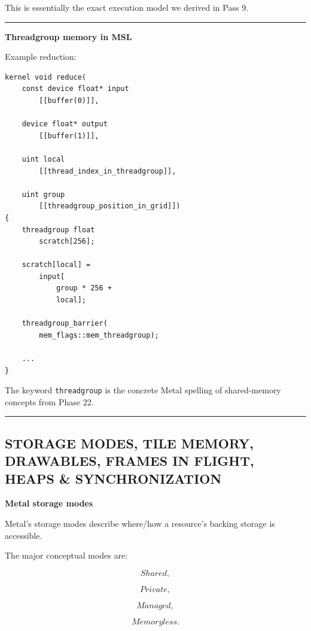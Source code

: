 This is essentially the exact execution model we derived in Pass 9.

\begin{center}\rule{0.5\linewidth}{0.5pt}\end{center}

\textbf{Threadgroup memory in MSL}

Example reduction:

\begin{verbatim}
kernel void reduce(
    const device float* input
        [[buffer(0)]],

    device float* output
        [[buffer(1)]],

    uint local
        [[thread_index_in_threadgroup]],

    uint group
        [[threadgroup_position_in_grid]])
{
    threadgroup float
        scratch[256];

    scratch[local] =
        input[
            group * 256 +
            local];

    threadgroup_barrier(
        mem_flags::mem_threadgroup);

    ...
}
\end{verbatim}

The keyword \texttt{threadgroup} is the concrete Metal spelling of shared-memory concepts from Phase 22.

\begin{center}\rule{0.5\linewidth}{0.5pt}\end{center}

\subsection{STORAGE MODES, TILE MEMORY, DRAWABLES, FRAMES IN FLIGHT, HEAPS \& SYNCHRONIZATION}\label{01-foundations-i-ch015-storage-modes-tile-memory-drawables-frames-in-flight-heaps-synchronization}

\hypertarget{01-foundations-i-ch015-storage-modes-tile-memory-drawables-frames-in-flight-heaps-synchronization}{}

\textbf{Metal storage modes}

Metal's storage modes describe where/how a resource's backing storage is accessible.

The major conceptual modes are:

\[
Shared,
\]

\[
Private,
\]

\[
Managed,
\]

\[
Memoryless.
\]

